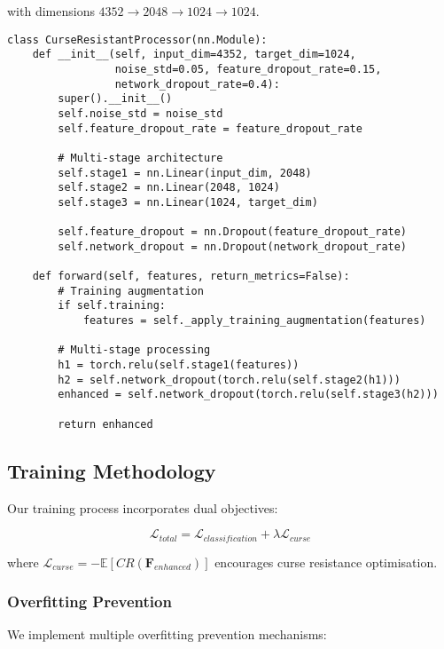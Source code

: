 \documentclass[11pt,a4paper]{article}
\begin{document}
with dimensions $4352 \rightarrow 2048 \rightarrow 1024 \rightarrow 1024$.

\begin{lstlisting}[caption=Curse-Resistant Processor Implementation]
class CurseResistantProcessor(nn.Module):
    def __init__(self, input_dim=4352, target_dim=1024,
                 noise_std=0.05, feature_dropout_rate=0.15,
                 network_dropout_rate=0.4):
        super().__init__()
        self.noise_std = noise_std
        self.feature_dropout_rate = feature_dropout_rate
        
        # Multi-stage architecture
        self.stage1 = nn.Linear(input_dim, 2048)
        self.stage2 = nn.Linear(2048, 1024) 
        self.stage3 = nn.Linear(1024, target_dim)
        
        self.feature_dropout = nn.Dropout(feature_dropout_rate)
        self.network_dropout = nn.Dropout(network_dropout_rate)
        
    def forward(self, features, return_metrics=False):
        # Training augmentation
        if self.training:
            features = self._apply_training_augmentation(features)
        
        # Multi-stage processing
        h1 = torch.relu(self.stage1(features))
        h2 = self.network_dropout(torch.relu(self.stage2(h1)))
        enhanced = self.network_dropout(torch.relu(self.stage3(h2)))
        
        return enhanced
\end{lstlisting}

\subsection{Training Methodology}

Our training process incorporates dual objectives:

\begin{equation}
\mathcal{L}_{total} = \mathcal{L}_{classification} + \lambda \mathcal{L}_{curse}
\end{equation}

where $\mathcal{L}_{curse} = -\mathbb{E}[CR(\mathbf{F}_{enhanced})]$ encourages curse resistance optimisation.

\subsubsection{Overfitting Prevention}

We implement multiple overfitting prevention mechanisms:
\end{document}
